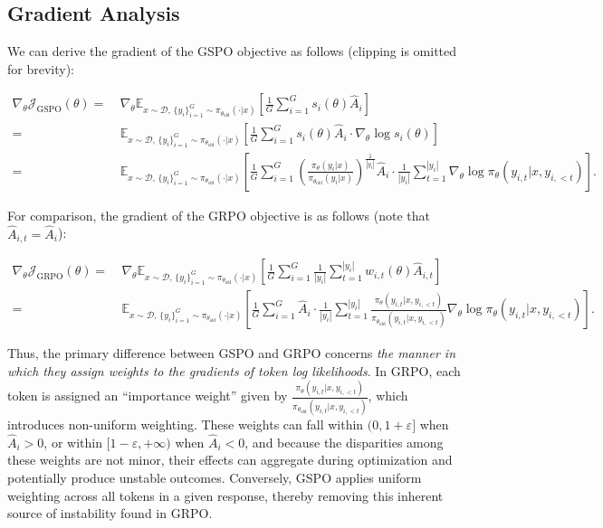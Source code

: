 \subsection{Gradient Analysis}
\label{subsec:gradient}

We can derive the gradient of the GSPO objective as follows (clipping is omitted for brevity):

\begin{align}
\nabla_{\theta} \mathcal{J}_\text{GSPO} (\theta)
=&\ 
\nabla_{\theta} \mathbb{E}_{ x \sim \mathcal{D},\, \{y_i\}_{i=1}^G \sim \pi_{\theta_\text{old}}( \cdot | x) }
\left[ 
\frac{1}{G} \sum_{i=1}^{G} s_{i}(\theta) \widehat{A}_{i}
\right] \\
= &\ 
\mathbb{E}_{ x \sim \mathcal{D},\, \{y_i\}_{i=1}^G \sim \pi_{\theta_\text{old}}( \cdot | x) }
\left[ 
\frac{1}{G} \sum_{i=1}^{G}
s_{i}(\theta) \widehat{A}_{i}
\cdot \nabla_{\theta} \log s_{i}(\theta)
\right] \\
=&\ 
\mathbb{E}_{ x \sim \mathcal{D},\, \{y_i\}_{i=1}^G \sim \pi_{\theta_\text{old}}( \cdot | x) }
\left[ 
\frac{1}{G} \sum_{i=1}^{G} 
\left( \frac{ \pi_{\theta} (y_i | x) }{ \pi_{\theta_\text{old}} (y_i | x)} \right)^{\frac{1}{|y_i|}} \widehat{A}_{i} 
\cdot \frac{1}{|y_i|} \sum_{t=1}^{|y_i|} \nabla_{\theta} \log \pi_{\theta} (y_{i,t} | x, y_{i,<t}) 
\right].
\label{equ:gspo_grad}
\end{align}

For comparison, the gradient of the GRPO objective is as follows (note that $\widehat{A}_{i,t} = \widehat{A}_{i}$):

\begin{align}
\nabla_{\theta} \mathcal{J}_\text{GRPO} (\theta) 
=&\ 
\nabla_{\theta} \mathbb{E}_{ x \sim \mathcal{D},\, \{y_i\}_{i=1}^G \sim \pi_{\theta_\text{old}}( \cdot | x) }
\left[ \frac{1}{G} \sum_{i=1}^{G} \frac{1}{|y_i|} \sum_{t=1}^{|y_i|} 
w_{i,t}(\theta) \widehat{A}_{i,t}
\right] \\
=&\
\mathbb{E}_{ x \sim \mathcal{D},\, \{y_i\}_{i=1}^G \sim \pi_{\theta_\text{old}}( \cdot | x) }
\left[ \frac{1}{G} \sum_{i=1}^{G} \widehat{A}_{i} 
\cdot \frac{1}{|y_i|} \sum_{t=1}^{|y_i|} 
\frac{ \pi_{\theta} (y_{i,t} | x, y_{i,<t}) }{ \pi_{\theta_\text{old}} (y_{i,t} | x,y_{i,<t})} 
\nabla_{\theta} \log \pi_{\theta} (y_{i,t} | x, y_{i,<t})  
\right].
\end{align}

Thus, the primary difference between GSPO and GRPO concerns \textit{the manner in which they assign weights to the gradients of token log likelihoods}. In GRPO, each token is assigned an “importance weight” given by $\frac{ \pi_{\theta} (y_{i,t} | x, y_{i,<t}) }{ \pi_{\theta_\text{old}} (y_{i,t} | x,y_{i,<t})}$, which introduces non-uniform weighting. These weights can fall within $(0, 1+\varepsilon]$ when $\widehat{A}_{i} >0$, or within $[1-\varepsilon, +\infty)$ when $\widehat{A}_{i} < 0$, and because the disparities among these weights are not minor, their effects can aggregate during optimization and potentially produce unstable outcomes. Conversely, GSPO applies uniform weighting across all tokens in a given response, thereby removing this inherent source of instability found in GRPO.

